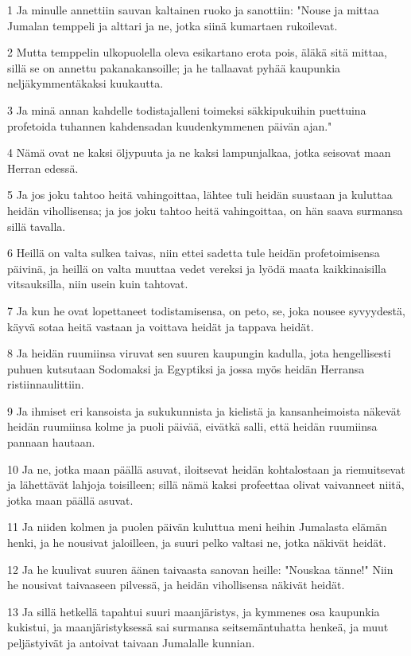 \par 1 Ja minulle annettiin sauvan kaltainen ruoko ja sanottiin: "Nouse ja mittaa Jumalan temppeli ja alttari ja ne, jotka siinä kumartaen rukoilevat.
\par 2 Mutta temppelin ulkopuolella oleva esikartano erota pois, äläkä sitä mittaa, sillä se on annettu pakanakansoille; ja he tallaavat pyhää kaupunkia neljäkymmentäkaksi kuukautta.
\par 3 Ja minä annan kahdelle todistajalleni toimeksi säkkipukuihin puettuina profetoida tuhannen kahdensadan kuudenkymmenen päivän ajan."
\par 4 Nämä ovat ne kaksi öljypuuta ja ne kaksi lampunjalkaa, jotka seisovat maan Herran edessä.
\par 5 Ja jos joku tahtoo heitä vahingoittaa, lähtee tuli heidän suustaan ja kuluttaa heidän vihollisensa; ja jos joku tahtoo heitä vahingoittaa, on hän saava surmansa sillä tavalla.
\par 6 Heillä on valta sulkea taivas, niin ettei sadetta tule heidän profetoimisensa päivinä, ja heillä on valta muuttaa vedet vereksi ja lyödä maata kaikkinaisilla vitsauksilla, niin usein kuin tahtovat.
\par 7 Ja kun he ovat lopettaneet todistamisensa, on peto, se, joka nousee syvyydestä, käyvä sotaa heitä vastaan ja voittava heidät ja tappava heidät.
\par 8 Ja heidän ruumiinsa viruvat sen suuren kaupungin kadulla, jota hengellisesti puhuen kutsutaan Sodomaksi ja Egyptiksi ja jossa myös heidän Herransa ristiinnaulittiin.
\par 9 Ja ihmiset eri kansoista ja sukukunnista ja kielistä ja kansanheimoista näkevät heidän ruumiinsa kolme ja puoli päivää, eivätkä salli, että heidän ruumiinsa pannaan hautaan.
\par 10 Ja ne, jotka maan päällä asuvat, iloitsevat heidän kohtalostaan ja riemuitsevat ja lähettävät lahjoja toisilleen; sillä nämä kaksi profeettaa olivat vaivanneet niitä, jotka maan päällä asuvat.
\par 11 Ja niiden kolmen ja puolen päivän kuluttua meni heihin Jumalasta elämän henki, ja he nousivat jaloilleen, ja suuri pelko valtasi ne, jotka näkivät heidät.
\par 12 Ja he kuulivat suuren äänen taivaasta sanovan heille: "Nouskaa tänne!" Niin he nousivat taivaaseen pilvessä, ja heidän vihollisensa näkivät heidät.
\par 13 Ja sillä hetkellä tapahtui suuri maanjäristys, ja kymmenes osa kaupunkia kukistui, ja maanjäristyksessä sai surmansa seitsemäntuhatta henkeä, ja muut peljästyivät ja antoivat taivaan Jumalalle kunnian.

